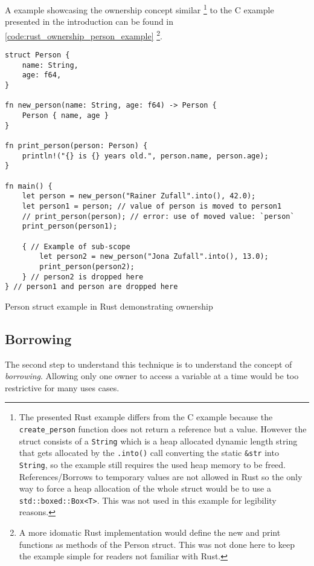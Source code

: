A example showcasing the ownership concept similar
\footnote{
    The presented Rust example differs from the C example because the
    \texttt{create\_person} function does not return a reference but a value.
    However the struct consists of a \texttt{String} which is a heap allocated
    dynamic length string that gets allocated by the \texttt{.into()} call
    converting the static \texttt{\&str} into \texttt{String}, so 
    the example still requires the used heap memory to be freed.
    References/Borrows to temporary values are not allowed in Rust so
    the only way to force a heap allocation of the whole struct would
    be to use a \texttt{std::boxed::Box<T>}. This was not used in this
    example for legibility reasons.
}
to the C example presented in the introduction
can be found in \autoref{code:rust_ownership_person_example}
\footnote{
    A more idomatic Rust implementation would define the new and print functions as methods of the Person struct.
    This was not done here to keep the example simple for readers not familiar with Rust.
}.

\begin{listing}[H] 
    \begin{verbatim}
struct Person {
    name: String,
    age: f64,
}

fn new_person(name: String, age: f64) -> Person {
    Person { name, age }
}

fn print_person(person: Person) {
    println!("{} is {} years old.", person.name, person.age);
}

fn main() {
    let person = new_person("Rainer Zufall".into(), 42.0);
    let person1 = person; // value of person is moved to person1
    // print_person(person); // error: use of moved value: `person`
    print_person(person1);

    { // Example of sub-scope
        let person2 = new_person("Jona Zufall".into(), 13.0);
        print_person(person2);
    } // person2 is dropped here
} // person1 and person are dropped here
    \end{verbatim}
    \caption{Person struct example in Rust demonstrating ownership}
    \label{code:rust_ownership_person_example}
\end{listing}

\subsection{Borrowing}

The second step to understand this technique is to understand the concept of \textit{borrowing}.
Allowing only one owner to access a variable at a time would be too restrictive
for many uses cases.

